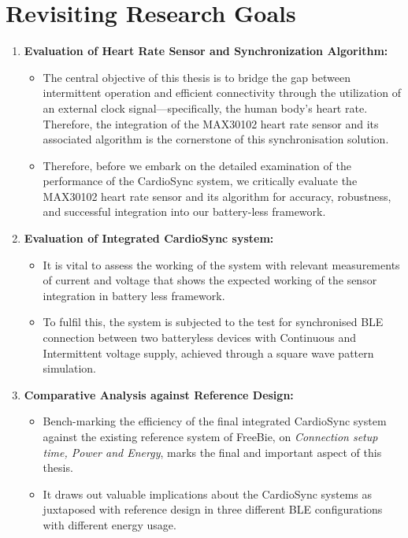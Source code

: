 \section{Revisiting Research Goals}
\begin{enumerate}
    \item \textbf{Evaluation of Heart Rate Sensor and Synchronization Algorithm:}
    \begin{itemize}
        \item The central objective of this thesis is to bridge the gap between intermittent operation and efficient connectivity through the utilization of an external clock signal—specifically, the human body's heart rate. Therefore, the integration of the MAX30102 heart rate sensor and its associated algorithm is the cornerstone of this synchronisation solution. 
        \item Therefore, before we embark on the detailed examination of the performance of the CardioSync system, we critically evaluate the MAX30102 heart rate sensor and its algorithm for accuracy, robustness, and successful integration into our battery-less framework.
    \end{itemize}

    \item \textbf{Evaluation of Integrated CardioSync system:}
    \begin{itemize}
        \item It is vital to assess the working of the system with relevant measurements of current and voltage that shows the expected working of the sensor integration in battery less framework.
        \item To fulfil this, the system is subjected to the test for synchronised BLE connection between two batteryless devices with Continuous and Intermittent voltage supply, achieved through a square wave pattern simulation.
    \end{itemize}

    \item \textbf{Comparative Analysis against Reference Design:}
    \begin{itemize}
        \item Bench-marking the efficiency of the final integrated CardioSync system against the existing reference system of FreeBie, on \textit{Connection setup time, Power and Energy}, marks the final and important aspect of this thesis.
        \item It draws out valuable implications about the CardioSync systems as juxtaposed with reference design in three different BLE configurations with different energy usage.
    \end{itemize}
\end{enumerate}

